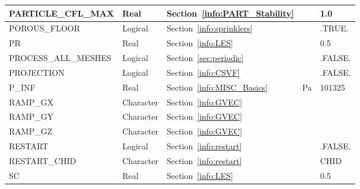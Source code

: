 \documentclass[11pt]{book}
\begin{document}
\begin{longtable}{@{\extracolsep{\fill}}|l|l|l|l|l|}
{\ct PARTICLE\_CFL\_MAX}                        & Real          & Section~\ref{info:PART_Stability}                     &               & 1.0               \\ \hline
{\ct POROUS\_FLOOR}                             & Logical       & Section~\ref{info:sprinklers}                         &               & {\ct .TRUE.}      \\ \hline
{\ct PR}                                        & Real          & Section~\ref{info:LES}                                &               & 0.5               \\ \hline
{\ct PROCESS\_ALL\_MESHES}                      & Logical       & Section~\ref{sec:periodic}                            &               & {\ct .FALSE.}     \\ \hline
{\ct PROJECTION}                                & Logical       & Section~\ref{info:CSVF}                               &               & {\ct .FALSE.}     \\ \hline
{\ct P\_INF}                                    & Real          & Section~\ref{info:MISC_Basics}                        & Pa            & 101325            \\ \hline
{\ct RAMP\_GX}                                  & Character     & Section~\ref{info:GVEC}                               &               &                   \\ \hline
{\ct RAMP\_GY}                                  & Character     & Section~\ref{info:GVEC}                               &               &                   \\ \hline
{\ct RAMP\_GZ}                                  & Character     & Section~\ref{info:GVEC}                               &               &                   \\ \hline
{\ct RESTART}                                   & Logical       & Section~\ref{info:restart}                            &               & {\ct .FALSE.}     \\ \hline
{\ct RESTART\_CHID}                             & Character     & Section~\ref{info:restart}                            &               & {\ct CHID}        \\ \hline
{\ct SC}                                        & Real          & Section~\ref{info:LES}                                &               & 0.5               \\ \hline

\end{longtable}
\end{document}
